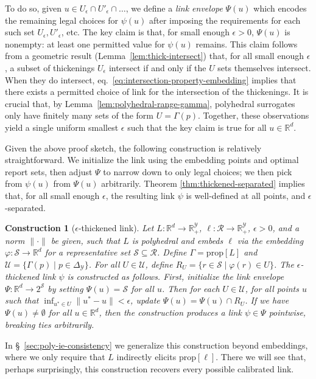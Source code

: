\documentclass[11pt]{article}
\newcommand{\reals}{\mathbb{R}}
\newcommand{\prop}[1]{\mathrm{prop}[#1]}
\newcommand{\simplex}{\Delta_\Y}
\newcommand{\R}{\mathcal{R}}
\newcommand{\Sc}{\mathcal{S}}
\newcommand{\U}{\mathcal{U}}
\newcommand{\Y}{\mathcal{Y}}
\newtheorem{construction}{Construction}
\begin{document}
To do so, given $u \in U_\epsilon \cap U'_\epsilon \cap \dots$, we define a \emph{link envelope} $\Psi(u)$ which encodes the remaining legal choices for $\psi(u)$ after imposing the requirements for each such set $U_\epsilon,U'_\epsilon$, etc.
The key claim is that, for small enough $\epsilon > 0$, $\Psi(u)$ is nonempty: at least one permitted value for $\psi(u)$ remains.
This claim follows from a geometric result (Lemma~\ref{lem:thick-intersect}) that, for all small enough $\epsilon$, a subset of thickenings $U_{\epsilon}$ intersect if and only if the $U$ sets themselves intersect.
When they do intersect, eq.~\eqref{eq:intersection-property-embedding} implies that there exists a permitted choice of link for the intersection of the thickenings.
It is crucial that, by Lemma~\ref{lem:polyhedral-range-gamma}, polyhedral surrogates only have finitely many sets of the form $U = \Gamma(p)$.
Together, these observations yield a single uniform smallest $\epsilon$ such that the key claim is true for all $u \in \reals^d$.

Given the above proof sketch, the following construction is relatively straightforward.
We initialize the link using the embedding points and optimal report sets, then adjust $\Psi$ to narrow down to only legal choices; we then pick from $\psi(u)$ from $\Psi(u)$ arbitrarily.
Theorem \ref{thm:thickened-separated} implies that, for all small enough $\epsilon$, the resulting link $\psi$ is well-defined at all points, and $\epsilon$-separated.
\begin{construction}[$\epsilon$-thickened link] \label{const:eps-thick-link}
  Let $L:\reals^d\to\reals^\Y_+$, $\ell:\R\to\reals^\Y_+$, $\epsilon > 0$, and a norm $\|\cdot\|$ be given, such that $L$ is polyhedral and embeds $\ell$ via the embedding $\varphi: \Sc \to \reals^d$ for a representative set $\Sc\subseteq\R$.
  Define $\Gamma = \prop L$ and $\U = \{\Gamma(p) \mid p \in \simplex\}$.
  For all $U \in \U$, define $R_U = \{r \in \Sc \mid \varphi(r) \in U\}$.
  The \emph{$\epsilon$-thickened link} $\psi$ is constructed as follows.
  First, initialize the \emph{link envelope} $\Psi: \reals^d \to 2^{\Sc}$ by setting $\Psi(u) = \Sc$ for all $u$.
  Then for each $U \in \U$, for all points $u$ such that $\inf_{u^* \in U} \|u^*-u\| < \epsilon$, update $\Psi(u) = \Psi(u) \cap R_U$.
  If we have $\Psi(u)\neq\emptyset$ for all $u\in\reals^d$, then the construction \emph{produces a link} $\psi \in \Psi$ pointwise, breaking ties arbitrarily.
\end{construction}
In \S~\ref{sec:poly-ie-consistency} we generalize this construction beyond embeddings, where we only require that $L$ indirectly elicits $\prop\ell$.
There we will see that, perhaps surprisingly, this construction recovers every possible calibrated link.
\end{document}
